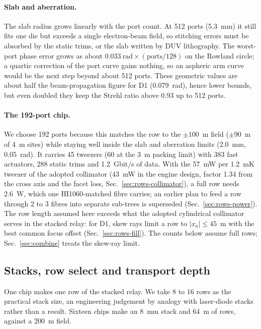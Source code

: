 \paragraph{Slab and aberration.} The slab radius grows linearly with the port count. At 512 ports (5.3~mm) it
still fits one die but exceeds a single electron-beam field, so stitching errors must be absorbed by the static
trims, or the slab written by DUV lithography. The worst-port phase error grows as about
$0.033~\mathrm{rad}\times(\text{ports}/128)$ on the Rowland circle; a quartic correction of the port curve gains
nothing, so an aspheric arm curve would be the next step beyond about 512 ports. These geometric values are
about half the beam-propagation figure for D1 (0.079~rad), hence lower bounds, but even doubled they keep the
Strehl ratio above 0.93 up to 512 ports.

\paragraph{The 192-port chip.} We choose 192 ports because this matches the row to the $\pm100$~\textmu m field
($\pm90$~\textmu m of 4~\textmu m sites) while staying well inside the slab and aberration limits (2.0~mm,
0.05~rad). It carries 45 tweezers (60 at the 3~\textmu m packing limit) with 383 fast actuators, 288 static
trims and 1.2~Gbit/s of data. With the 57~mW per 1.2~mK tweezer of the adopted collimator (43~mW in the engine
design, factor 1.34 from the cross axis and the facet loss, Sec.~\ref{sec:rows-collimator}), a full row needs
2.6~W, which one HI1060-matched fibre carries; an earlier plan to feed a row through 2 to 3 fibres into separate
sub-trees is superseded (Sec.~\ref{sec:rows-power}). The row length assumed here exceeds what the adopted
cylindrical collimator serves in the stacked relay: for D1, skew rays limit a row to $|x_a|\le45$~\textmu m with
the best common focus offset (Sec.~\ref{sec:rows-fill}). The counts below assume full rows;
Sec.~\ref{sec:combine} treats the skew-ray limit.

\subsection{Stacks, row select and transport depth}\label{sec:moretweezers-stack}

One chip makes one row of the stacked relay. We take 8 to 16 rows as the practical stack size, an engineering
judgement by analogy with laser-diode stacks rather than a result. Sixteen chips make an 8~mm stack and
64~\textmu m of rows, against a 200~\textmu m field.

